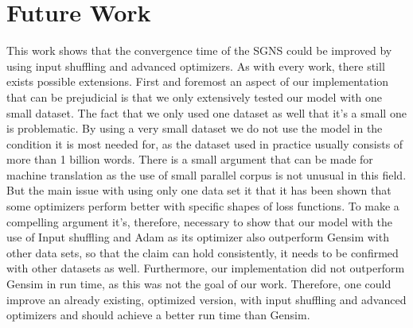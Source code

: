 \section{Future Work}
This work shows that the convergence time of the SGNS could be improved by using input shuffling and advanced optimizers. As with every work, there still exists possible extensions. First and foremost an aspect of our implementation that can be prejudicial is that we only extensively tested our model with one small dataset. The fact that we only used one dataset as well that it's a small one is problematic. By using a very small dataset we do not use the model in the condition it is most needed for, as the dataset used in practice usually consists of more than 1 billion words. There is a small argument that can be made for machine translation as the use of small parallel corpus is not unusual in this field. But the main issue with using only one data set it that it has been shown that some optimizers perform better with specific shapes of loss functions. To make a compelling argument it's, therefore, necessary to show that our model with the use of Input shuffling and Adam as its optimizer also outperform Gensim with other data sets, so that the claim can hold consistently, it needs to be confirmed with other datasets as well.
Furthermore, our implementation did not outperform Gensim in run time, as this was not the goal of our work. Therefore, one could improve an already existing, optimized version, with input shuffling and advanced optimizers and should achieve a better run time than Gensim.